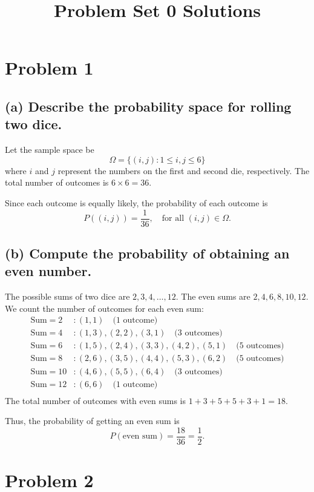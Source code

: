 \documentclass{article}
\title{Problem Set 0 Solutions}
\author{}
\date{}
\begin{document}
\maketitle

\section*{Problem 1}
\subsection*{(a) Describe the probability space for rolling two dice.}
Let the sample space be
\[
\Omega = \{(i, j) : 1 \leq i, j \leq 6\}
\]
where \( i \) and \( j \) represent the numbers on the first and second die, respectively. The total number of outcomes is \( 6 \times 6 = 36 \).

Since each outcome is equally likely, the probability of each outcome is
\[
P((i,j)) = \frac{1}{36}, \quad \text{for all } (i,j) \in \Omega.
\]

\subsection*{(b) Compute the probability of obtaining an even number.}
The possible sums of two dice are \( 2, 3, 4, \dots, 12 \). The even sums are \( 2, 4, 6, 8, 10, 12 \). We count the number of outcomes for each even sum:
\[
\begin{aligned}
    \text{Sum} = 2 &: (1,1) \quad \text{(1 outcome)} \\
    \text{Sum} = 4 &: (1,3), (2,2), (3,1) \quad \text{(3 outcomes)} \\
    \text{Sum} = 6 &: (1,5), (2,4), (3,3), (4,2), (5,1) \quad \text{(5 outcomes)} \\
    \text{Sum} = 8 &: (2,6), (3,5), (4,4), (5,3), (6,2) \quad \text{(5 outcomes)} \\
    \text{Sum} = 10 &: (4,6), (5,5), (6,4) \quad \text{(3 outcomes)} \\
    \text{Sum} = 12 &: (6,6) \quad \text{(1 outcome)} \\
\end{aligned}
\]
The total number of outcomes with even sums is \( 1 + 3 + 5 + 5 + 3 + 1 = 18 \).

Thus, the probability of getting an even sum is
\[
P(\text{even sum}) = \frac{18}{36} = \frac{1}{2}.
\]

\section*{Problem 2}
\end{document}
